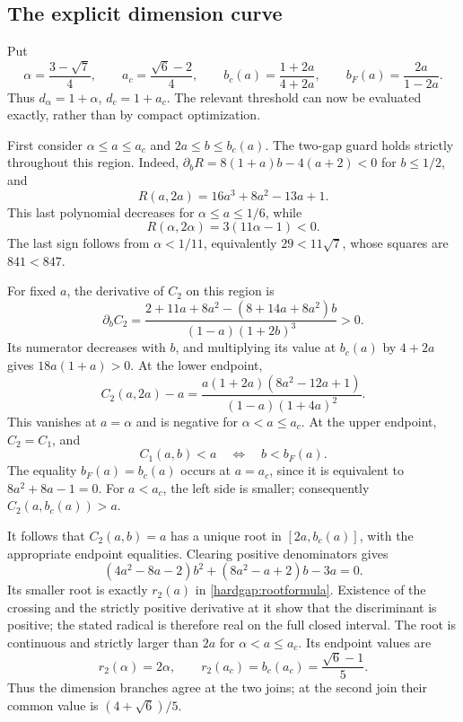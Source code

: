 \subsection{The explicit dimension curve}\label{hardgap:dimension}
Put
\[
 \alpha=\frac{3-\sqrt7}{4},\qquad
 a_c=\frac{\sqrt6-2}{4},\qquad
 b_c(a)=\frac{1+2a}{4+2a},\qquad
 b_F(a)=\frac{2a}{1-2a}.
\]
Thus \(d_\alpha=1+\alpha\), \(d_c=1+a_c\). The relevant threshold
can now be evaluated exactly, rather than by compact optimization.

First consider \(\alpha\le a\le a_c\) and \(2a\le b\le b_c(a)\).
The two-gap guard holds strictly throughout this region. Indeed,
\(\partial_b R=8(1+a)b-4(a+2)<0\) for \(b\le1/2\), and
\[
 R(a,2a)=16a^3+8a^2-13a+1.
\]
This last polynomial decreases for \(\alpha\le a\le1/6\), while
\[
 R(\alpha,2\alpha)=3(11\alpha-1)<0.
\]
The last sign follows from \(\alpha<1/11\), equivalently
\(29<11\sqrt7\), whose squares are \(841<847\).

For fixed \(a\), the derivative of \(C_2\) on this region is
\[
 \partial_bC_2=
 \frac{2+11a+8a^2-(8+14a+8a^2)b}{(1-a)(1+2b)^3}>0.
\]
Its numerator decreases with \(b\), and multiplying its value at
\(b_c(a)\) by \(4+2a\) gives \(18a(1+a)>0\).
At the lower endpoint,
\begin{equation}\label{hardgap:baseline-sign}
 C_2(a,2a)-a
 =\frac{a(1+2a)(8a^2-12a+1)}{(1-a)(1+4a)^2}.
\end{equation}
This vanishes at \(a=\alpha\) and is negative for
\(\alpha<a\le a_c\). At the upper endpoint, \(C_2=C_1\), and
\[
 C_1(a,b)<a\quad\Longleftrightarrow\quad b<b_F(a).
\]
The equality \(b_F(a)=b_c(a)\) occurs at \(a=a_c\), since it is
equivalent to \(8a^2+8a-1=0\). For \(a<a_c\), the left side is
smaller; consequently \(C_2(a,b_c(a))>a\).

It follows that \(C_2(a,b)=a\) has a unique root in
\([2a,b_c(a)]\), with the appropriate endpoint equalities. Clearing
positive denominators gives
\[
 (4a^2-8a-2)b^2+(8a^2-a+2)b-3a=0.
\]
Its smaller root is exactly \(r_2(a)\) in
\eqref{hardgap:rootformula}. Existence of the crossing and the strictly
positive derivative at it show that the discriminant is positive;
the stated radical is therefore real on the full closed interval.
The root is continuous and strictly larger than \(2a\) for
\(\alpha<a\le a_c\). Its endpoint values are
\[
 r_2(\alpha)=2\alpha,\qquad
 r_2(a_c)=b_c(a_c)=\frac{\sqrt6-1}{5}.
\]
Thus the dimension branches agree at the two joins; at the second join
their common value is \((4+\sqrt6)/5\).

